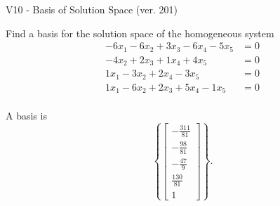 \begin{exercise}
  \begin{exerciseTitle}V10 - Basis of Solution Space (ver. 201)\end{exerciseTitle}
  \begin{exerciseStatement}
    Find a basis for the solution space of the homogeneous system 
\begin{align*}
 -6 x_ 1 -6 x_ 2 + 3 x_ 3 -6 x_ 4 -5 x_ 5 &= 0  \\ 
  -4 x_ 2 + 2 x_ 3 + 1 x_ 4 + 4 x_ 5 &= 0  \\ 
  1 x_ 1 -3 x_ 2 + 2 x_ 4 -3 x_ 5 &= 0  \\ 
  1 x_ 1 -6 x_ 2 + 2 x_ 3 + 5 x_ 4 -1 x_ 5 &= 0  \\ 
 \end{align*}


 
  \end{exerciseStatement}

  \begin{exerciseAnswer}
   A basis is   
\[\left\{\left[\begin{array}{c}
-\frac{311}{81} \\
-\frac{98}{81} \\
-\frac{47}{9} \\
\frac{130}{81} \\
1
\end{array}\right]\right\}.\]

  


  \end{exerciseAnswer}
\end{exercise}